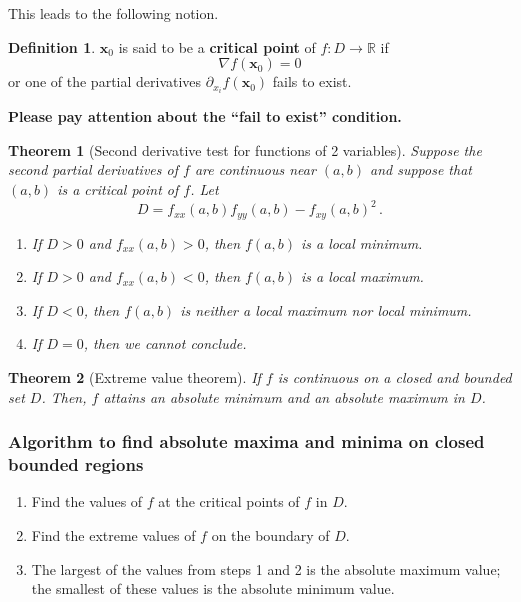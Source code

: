 \documentclass[
]{article}
\newtheorem{theorem}{Theorem}[section]
\theoremstyle{definition}
\newtheorem{definition}{Definition}[section]
\theoremstyle{definition}
\theoremstyle{definition}
\theoremstyle{definition}
\theoremstyle{remark}
\begin{document}
This leads to the following notion.

\begin{definition}
\(\mathbf{x}_0\) is said to be a \textbf{critical point} of \(f:D\to \mathbb{R}\) if
\begin{equation*}
    \nabla f(\mathbf{x}_0) = 0
\end{equation*}
or one of the partial derivatives \(\partial_{x_i} f(\mathbf{x}_0)\) fails to exist.
\end{definition}

\textbf{Please pay attention about the ``fail to exist'' condition.}

\begin{theorem}[Second derivative test for functions of 2 variables]

Suppose the second partial derivatives of \(f\) are continuous near \((a,b)\)
and suppose that \((a,b)\) is a critical point of \(f\).
Let
\begin{equation*}
    D = f_{xx}(a,b) f_{yy}(a,b) - f_{xy}(a,b)^2\,.
\end{equation*}

\begin{enumerate}
\def\labelenumi{\arabic{enumi}.}
\item
  If \(D>0\) and \(f_{xx}(a,b) >0\), then \(f(a,b)\) is a local minimum.
\item
  If \(D>0\) and \(f_{xx}(a,b) <0\), then \(f(a,b)\) is a local maximum.
\item
  If \(D<0\), then \(f(a,b)\) is neither a local maximum nor local minimum.
\item
  If \(D=0\), then we cannot conclude.
\end{enumerate}

\end{theorem}

\begin{theorem}[Extreme value theorem]
If \(f\) is continuous on a \emph{closed} and \emph{bounded} set \(D\). Then,
\(f\) attains an absolute minimum and an absolute maximum in \(D\).
\end{theorem}

\subsubsection{Algorithm to find absolute maxima and minima on closed bounded regions}\label{algorithm-to-find-absolute-maxima-and-minima-on-closed-bounded-regions}

\begin{enumerate}
\def\labelenumi{\arabic{enumi}.}
\item
  Find the values of \(f\) at the critical points of \(f\) in \(D\).
\item
  Find the extreme values of \(f\) on the boundary of \(D\).
\item
  The largest of the values from steps 1 and 2 is the absolute maximum value;
  the smallest of these values is the absolute minimum value.
\end{enumerate}
\end{document}

